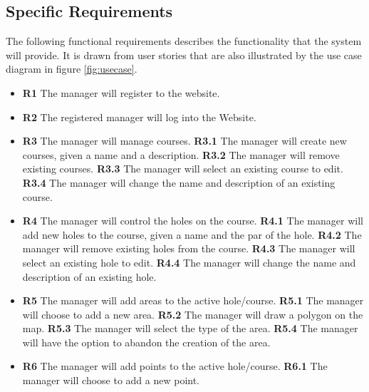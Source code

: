 \documentclass{article}
\begin{document}
    \subsection{Specific Requirements}
    \label{sec:requirements}

    The following functional requirements describes the functionality that the
    system will provide. It is drawn from user stories that are also
    illustrated by the use case diagram in figure \ref{fig:usecase}.

    \begin{itemize}
        \item
            \textbf{R1} The manager will register to the website.
        \item
            \textbf{R2} The registered manager will log into the Website.
        \item
            \textbf{R3} The manager will manage courses.
            \subitem \textbf{R3.1} The manager will create new courses, given a
            name and a description.
            \subitem \textbf{R3.2} The manager will remove existing courses.
            \subitem \textbf{R3.3} The manager will select an existing course
            to edit.
            \subitem \textbf{R3.4} The manager will change the name and
            description of an existing course.
        \item
            \textbf{R4} The manager will control the holes on the course.
            \subitem \textbf{R4.1} The manager will add new holes to the
            course, given a name and the par of the hole.
            \subitem \textbf{R4.2} The manager will remove existing holes from
            the course.
            \subitem \textbf{R4.3} The manager will select an existing hole to
            edit.
            \subitem \textbf{R4.4} The manager will change the name and
            description of an existing hole.
        \item
            \textbf{R5} The manager will add areas to the active hole/course.
            \subitem \textbf{R5.1} The manager will choose to add a new area.
            \subitem \textbf{R5.2} The manager will draw a polygon on the map.
            \subitem \textbf{R5.3} The manager will select the type of the
            area.
            \subitem \textbf{R5.4} The manager will have the option to abandon
            the creation of the area.
        \item
            \textbf{R6} The manager will add points to the active hole/course.
            \subitem \textbf{R6.1} The manager will choose to add a new point.

\end{itemize}
\end{document}
